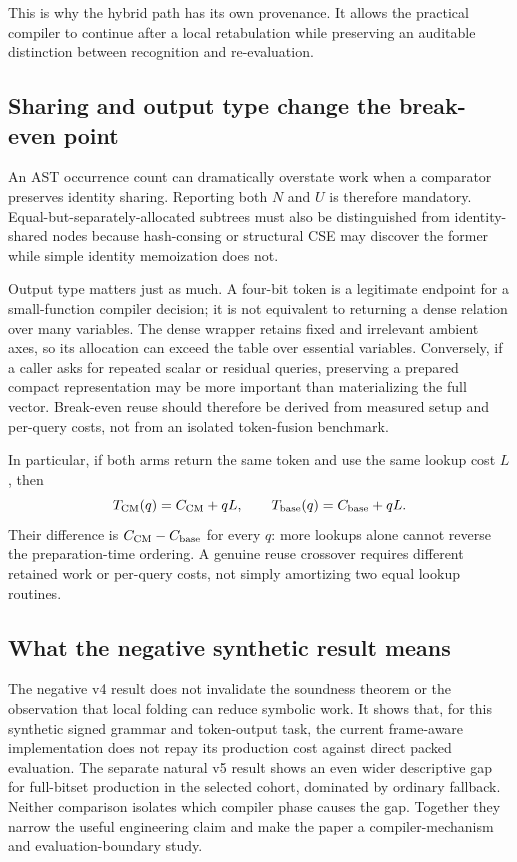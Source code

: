 \documentclass[10pt]{article}
\theoremstyle{plain}
\theoremstyle{definition}
\theoremstyle{remark}
\begin{document}
This is why the hybrid path has its own provenance. It allows the practical compiler to continue after a local retabulation while preserving an auditable distinction between recognition and re-evaluation.

\subsection{Sharing and output type change the break-even point}

An AST occurrence count can dramatically overstate work when a comparator preserves identity sharing. Reporting both $N$ and $U$ is therefore mandatory. Equal-but-separately-allocated subtrees must also be distinguished from identity-shared nodes because hash-consing or structural CSE may discover the former while simple identity memoization does not.

Output type matters just as much. A four-bit token is a legitimate endpoint for a small-function compiler decision; it is not equivalent to returning a dense relation over many variables. The dense wrapper retains fixed and irrelevant ambient axes, so its allocation can exceed the table over essential variables. Conversely, if a caller asks for repeated scalar or residual queries, preserving a prepared compact representation may be more important than materializing the full vector. Break-even reuse should therefore be derived from measured setup and per-query costs, not from an isolated token-fusion benchmark.

In particular, if both arms return the same token and use the same lookup cost $L$, then
\[
 T_{\rm CM}(q)=C_{\rm CM}+qL,\qquad
 T_{\rm base}(q)=C_{\rm base}+qL.
\]
Their difference is $C_{\rm CM}-C_{\rm base}$ for every $q$: more lookups alone cannot reverse the preparation-time ordering. A genuine reuse crossover requires different retained work or per-query costs, not simply amortizing two equal lookup routines.

\subsection{What the negative synthetic result means}

The negative v4 result does not invalidate the soundness theorem or the observation that local folding can reduce symbolic work. It shows that, for this synthetic signed grammar and token-output task, the current frame-aware implementation does not repay its production cost against direct packed evaluation. The separate natural v5 result shows an even wider descriptive gap for full-bitset production in the selected cohort, dominated by ordinary fallback. Neither comparison isolates which compiler phase causes the gap. Together they narrow the useful engineering claim and make the paper a compiler-mechanism and evaluation-boundary study.
\end{document}
